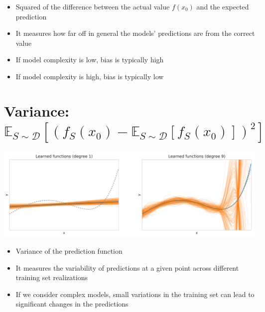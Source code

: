 \documentclass[10pt]{article}
\begin{document}
\begin{itemize}
  \item Squared of the difference between the actual value $f\left(x_{0}\right)$ and the expected prediction

  \item It measures how far off in general the models' predictions are from the correct value

  \item If model complexity is low, bias is typically high

  \item If model complexity is high, bias is typically low

\end{itemize}

\section*{Variance: $\mathbb{E}_{S \sim \mathscr{D}}\left[\left(f_{S}\left(x_{0}\right)-\mathbb{E}_{S \sim \mathscr{D}}\left[f_{S}\left(x_{0}\right)\right]\right)^{2}\right]$}
\begin{center}
\includegraphics[max width=\textwidth]{2023_12_30_442f876157646883c2c9g-25}
\end{center}

\begin{itemize}
  \item Variance of the prediction function
  \item It measures the variability of predictions at a given point across different training set realizations
  \item If we consider complex models, small variations in the training set can lead to significant changes in the predictions
\end{itemize}
\end{document}
